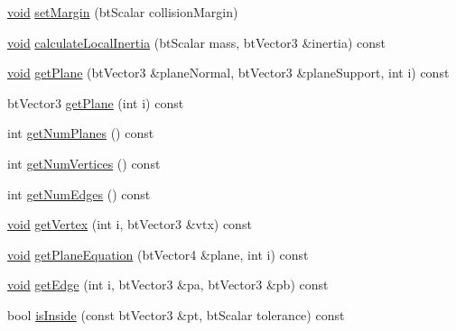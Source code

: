 \begin{DoxyCompactItemize}
\item 
\mbox{\hyperlink{_thread_8h_af1e856da2e658414cb2456cb6f7ebc66}{void}} \mbox{\hyperlink{classnjli_1_1_physics_shape_box_a44141f2092a02d14d8b3d1036c53b709}{set\+Margin}} (bt\+Scalar collision\+Margin)
\item 
\mbox{\hyperlink{_thread_8h_af1e856da2e658414cb2456cb6f7ebc66}{void}} \mbox{\hyperlink{classnjli_1_1_physics_shape_box_a96db7f2f7c960c4c3b57c77b1bdeac8f}{calculate\+Local\+Inertia}} (bt\+Scalar mass, bt\+Vector3 \&inertia) const
\item 
\mbox{\hyperlink{_thread_8h_af1e856da2e658414cb2456cb6f7ebc66}{void}} \mbox{\hyperlink{classnjli_1_1_physics_shape_box_afdf7c5e8b6d17bbee2f62a0083bfd072}{get\+Plane}} (bt\+Vector3 \&plane\+Normal, bt\+Vector3 \&plane\+Support, int i) const
\item 
bt\+Vector3 \mbox{\hyperlink{classnjli_1_1_physics_shape_box_ae7e7ac75e0350dbffcb6ed9c0e6491c8}{get\+Plane}} (int i) const
\item 
int \mbox{\hyperlink{classnjli_1_1_physics_shape_box_a107c31779cfb98b22c44b90d66f93db9}{get\+Num\+Planes}} () const
\item 
int \mbox{\hyperlink{classnjli_1_1_physics_shape_box_a36c3b4521b3559311f259e3c1bec1ff6}{get\+Num\+Vertices}} () const
\item 
int \mbox{\hyperlink{classnjli_1_1_physics_shape_box_afaa84e3e0b58aa2fd2a1bdd269c39c21}{get\+Num\+Edges}} () const
\item 
\mbox{\hyperlink{_thread_8h_af1e856da2e658414cb2456cb6f7ebc66}{void}} \mbox{\hyperlink{classnjli_1_1_physics_shape_box_af1045ee343d3434f0187c526bfc23fb5}{get\+Vertex}} (int i, bt\+Vector3 \&vtx) const
\item 
\mbox{\hyperlink{_thread_8h_af1e856da2e658414cb2456cb6f7ebc66}{void}} \mbox{\hyperlink{classnjli_1_1_physics_shape_box_a9d83af6033c2604aa9472720ebda40be}{get\+Plane\+Equation}} (bt\+Vector4 \&plane, int i) const
\item 
\mbox{\hyperlink{_thread_8h_af1e856da2e658414cb2456cb6f7ebc66}{void}} \mbox{\hyperlink{classnjli_1_1_physics_shape_box_adacd48a8deac2b0469f79372c5637170}{get\+Edge}} (int i, bt\+Vector3 \&pa, bt\+Vector3 \&pb) const
\item 
bool \mbox{\hyperlink{classnjli_1_1_physics_shape_box_ad3df70682f66f1a613a14c03e5390cc2}{is\+Inside}} (const bt\+Vector3 \&pt, bt\+Scalar tolerance) const
\end{DoxyCompactItemize}
